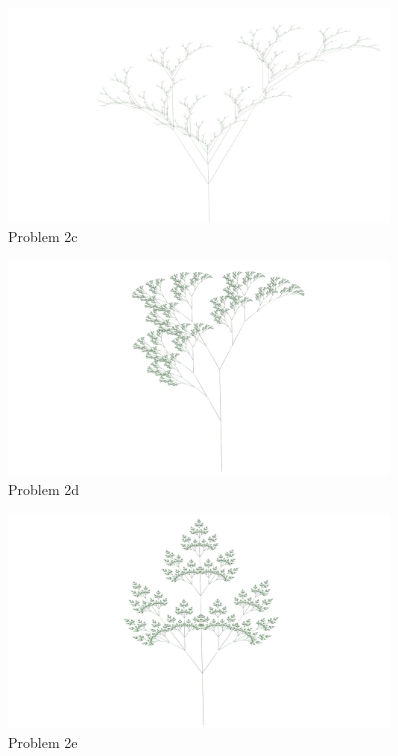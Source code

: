 \begin{figure}[H]
    \centering
    \includegraphics[width=0.90\textwidth]{figures/L-systems/c.png}
    \caption{Problem 2c}\label{fig:prob2c}
\end{figure}

\begin{figure}[H]
    \centering
    \includegraphics[width=0.90\textwidth]{figures/L-systems/d.png}
    \caption{Problem 2d}\label{fig:prob2d}
\end{figure}

\begin{figure}[H]
    \centering
    \noindent\includegraphics[width=0.90\textwidth]{figures/L-systems/e.png}
    \caption{Problem 2e}\label{fig:prob2e}
\end{figure}

